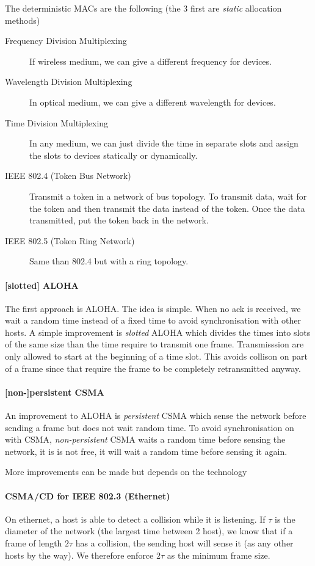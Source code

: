 The deterministic MACs are the following (the 3 first are \emph{static} allocation methods)
\begin{description}
  \item[Frequency Division Multiplexing]
    If wireless medium, we can give a different frequency for devices.
  \item[Wavelength Division Multiplexing]
    In optical medium, we can give a different wavelength for devices.
  \item[Time Division Multiplexing]
    In any medium, we can just divide the time in separate slots and assign the slots to devices
    statically or dynamically.
  \item[IEEE 802.4 (Token Bus Network)]
    Transmit a token in a network of bus topology.
    To transmit data, wait for the token and then transmit the data instead of the token.
    Once the data transmitted, put the token back in the network.
  \item[IEEE 802.5 (Token Ring Network)]
    Same than 802.4 but with a ring topology.
\end{description}

\paragraph{[slotted] ALOHA}
The first approach is ALOHA.
The idea is simple.
When no ack is received, we wait a random time instead of a fixed time to avoid synchronisation with other hosts.
A simple improvement is \emph{slotted} ALOHA which divides the times into slots of the same size than the time require to transmit one frame.
Transmisssion are only allowed to start at the beginning of a time slot.
This avoids collison on part of a frame since that require the frame to be completely retransmitted anyway.

\paragraph{[non-]persistent CSMA}
An improvement to ALOHA is \emph{persistent} CSMA which sense the network before sending a frame but does not wait random time.
To avoid synchronisation on with CSMA, \emph{non-persistent} CSMA waits a random time before sensing the network,
it is is not free, it will wait a random time before sensing it again.

More improvements can be made but depends on the technology
\paragraph{CSMA/CD for IEEE 802.3 (Ethernet)}
On ethernet, a host is able to detect a collision while it is listening.
If $\tau$ is the diameter of the network (the largest time between 2 host),
we know that if a frame of length $2\tau$ has a collision, the sending host will sense it (as any other hosts by the way).
We therefore enforce $2\tau$ as the minimum frame size.

